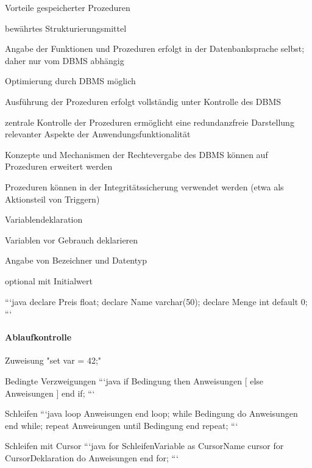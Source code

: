 \documentclass[a4paper]{article}
\begin{document}
\begin{multicols}{3}
    Vorteile gespeicherter Prozeduren
    \begin{itemize*}
        \item bewährtes Strukturierungsmittel
        \item Angabe der Funktionen und Prozeduren erfolgt in der Datenbanksprache selbst; daher nur vom DBMS abhängig
        \item Optimierung durch DBMS möglich
        \item Ausführung der Prozeduren erfolgt vollständig unter Kontrolle des DBMS
        \item zentrale Kontrolle der Prozeduren ermöglicht eine redundanzfreie Darstellung relevanter Aspekte der Anwendungsfunktionalität
        \item Konzepte und Mechanismen der Rechtevergabe des DBMS können auf Prozeduren erweitert werden
        \item Prozeduren können in der Integritätssicherung verwendet werden (etwa als Aktionsteil von Triggern)
    \end{itemize*}

    Variablendeklaration
    \begin{itemize*}
        \item Variablen vor Gebrauch deklarieren
        \item Angabe von Bezeichner und Datentyp
        \item optional mit Initialwert
    \end{itemize*}
    ```java
    declare Preis float;
    declare Name varchar(50);
    declare Menge int default 0;
    ```

    \paragraph{Ablaufkontrolle}
    \begin{itemize*}
        \item Zuweisung "set var = 42;"
        \item Bedingte Verzweigungen
        ```java
        if Bedingung then Anweisungen
            [ else Anweisungen ] end if;
        ```
        \item Schleifen
        ```java
        loop Anweisungen end loop;
        while Bedingung do
        Anweisungen end while;
        repeat Anweisungen
        until Bedingung end repeat;
        ```
        \item Schleifen mit Cursor
        ```java
        for SchleifenVariable as CursorName cursor for
        CursorDeklaration
        do
        Anweisungen
        end for;
        ```
    \end{itemize*}


\end{multicols}
\end{document}
